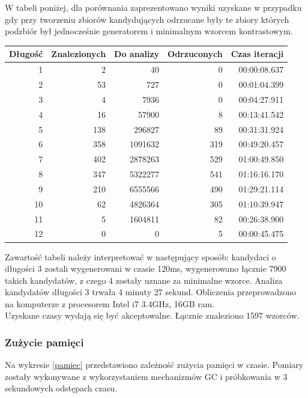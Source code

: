 \documentclass[a4paper,12pt]{article}
\begin{document}
W tabeli poniżej, dla porównania zaprezentowano wyniki uzyskane w przypadku gdy przy tworzeniu zbiorów kandydujących odrzucane były te zbiory których podzbiór był jednocześnie generatorem i minimalnym wzorcem kontrastowym.

\vspace{0.5cm}

\begin{tabular}{|r|r|r|r|r|}
\hline
Długość & Znalezionych & Do analizy & Odrzuconych & Czas iteracji\\ \hline
1 & 2 & 40 & 0 &  00:00:08.637 \\ \hline 
2 & 53 & 727 & 0 & 00:01:04.399 \\ \hline
3 & 4 & 7936 & 0 & 00:04:27.911 \\ \hline
4 & 16 & 57900 & 8 & 00:13:41.542 \\ \hline
5 & 138 & 296827 & 89 & 00:31:31.924 \\ \hline
6 & 358 & 1091632 & 319 & 00:49:20.457 \\ \hline
7 & 402 & 2878263 & 529 & 01:00:49.850 \\ \hline
8 & 347 & 5322277 & 541 & 01:16:16.170 \\ \hline
9 & 210 & 6555566 & 490 & 01:29:21.114 \\ \hline
10 & 62 & 4826364 & 305 & 01:10:39.947 \\ \hline
11 & 5 & 1604811 & 82 & 00:26:38.900 \\ \hline
12 & 0 & 0 & 5 & 00:00:45.475 \\ \hline
\end{tabular}

\vspace{0.5cm}

Zawartość tabeli należy interpretować w następujący sposób: kandydaci o długości 3 zostali wygenerowani w czasie 120ms, wygenerowano łącznie 7900 takich kandydatów, z czego 4 zostały uznane za minimalne wzorce. Analiza kandydatów długości 3 trwała 4 minuty 27 sekund. Obliczenia przeprowadzono na komputerze z procesorem Intel i7 3.4GHz, 16GB ram.\\

Uzyskane czasy wydają się być akceptowalne. Łącznie znaleziono 1597 wzorców.\\

\subsubsection{Zużycie pamięci}

Na wykresie \ref{pamiec} przedstawiono zależność zużycia pamięci w czasie. Pomiary zostały wykonywane z wykorzystaniem mechanizmów GC i próbkowania w 3 sekundowych odstępach czasu.
\end{document}

